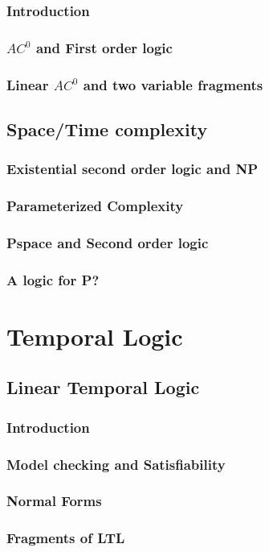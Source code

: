 \section{Introduction}
\section{$AC^0$ and First order logic}
\section{Linear $AC^0$ and two variable fragments}

\chapter{Space/Time complexity}
\section{Existential second order logic and NP}
\section{Parameterized Complexity}
\section{Pspace and Second order logic}
\section{A logic for P?}

\part{Temporal Logic}
\chapter{Linear Temporal Logic}
\section{Introduction}
\section{Model checking and Satisfiability}
\section{Normal Forms}
\section{Fragments of LTL}

